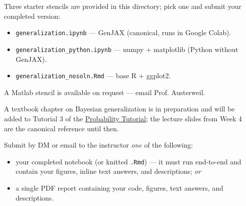 \documentclass[11pt]{article}
\begin{document}
\vspace{1em}
 Three starter stencils are provided in this directory; pick one and submit your completed version:
\begin{itemize}
    \item \texttt{generalization.ipynb} --- GenJAX (canonical, runs in Google Colab).
    \item \texttt{generalization\_python.ipynb} --- numpy + matplotlib (Python without GenJAX).
    \item \texttt{generalization\_nosoln.Rmd} --- base R + ggplot2.
\end{itemize}
A Matlab stencil is available on request --- email Prof. Austerweil.

\vspace{0.5em}
 A textbook chapter on Bayesian generalization is in preparation and will be added to Tutorial 3 of the \href{https://josephausterweil.github.io/probintro/}{Probability Tutorial}; the lecture slides from Week 4 are the canonical reference until then.

\vspace{0.5em}
 Submit by DM or email to the instructor {\em one} of the following:
\begin{itemize}
    \item your completed notebook (or knitted \texttt{.Rmd}) --- it must run end-to-end and contain your figures, inline text answers, and descriptions; {\em or}
    \item a single PDF report containing your code, figures, text answers, and descriptions.
\end{itemize}
\end{document}
